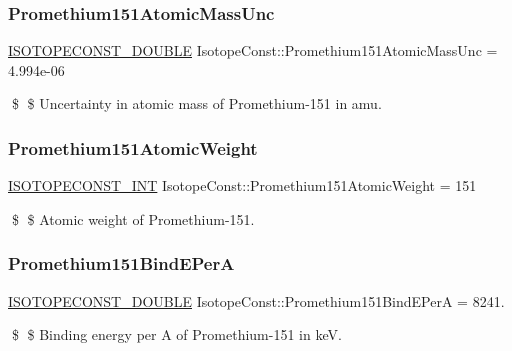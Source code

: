 \subsubsection{\texorpdfstring{Promethium151\+Atomic\+Mass\+Unc}{Promethium151AtomicMassUnc}}
{\footnotesize\ttfamily \mbox{\hyperlink{group___isotope_const-_macros_ga8f45a7272ce02c0b4c65c44636ed719a}{I\+S\+O\+T\+O\+P\+E\+C\+O\+N\+S\+T\+\_\+\+D\+O\+U\+B\+LE}} Isotope\+Const\+::\+Promethium151\+Atomic\+Mass\+Unc = 4.\+994e-\/06}

\$ \$ Uncertainty in atomic mass of Promethium-\/151 in amu. \mbox{\label{group___isotope_const-_promethium-_pm151_ga060f6be4c4ba25770dea254056cc5135}} 
\subsubsection{\texorpdfstring{Promethium151\+Atomic\+Weight}{Promethium151AtomicWeight}}
{\footnotesize\ttfamily \mbox{\hyperlink{group___isotope_const-_macros_ga5f18360b3e99483a35c32d789e62621c}{I\+S\+O\+T\+O\+P\+E\+C\+O\+N\+S\+T\+\_\+\+I\+NT}} Isotope\+Const\+::\+Promethium151\+Atomic\+Weight = 151}

\$ \$ Atomic weight of Promethium-\/151. \mbox{\label{group___isotope_const-_promethium-_pm151_ga129cf74b9ee6ffa6c56e3f9517997b91}} 
\subsubsection{\texorpdfstring{Promethium151\+Bind\+E\+PerA}{Promethium151BindEPerA}}
{\footnotesize\ttfamily \mbox{\hyperlink{group___isotope_const-_macros_ga8f45a7272ce02c0b4c65c44636ed719a}{I\+S\+O\+T\+O\+P\+E\+C\+O\+N\+S\+T\+\_\+\+D\+O\+U\+B\+LE}} Isotope\+Const\+::\+Promethium151\+Bind\+E\+PerA = 8241.}

\$ \$ Binding energy per A of Promethium-\/151 in keV. \mbox{\label{group___isotope_const-_promethium-_pm151_gacae7284399cf48d39f7fff9db0a21057}} 
